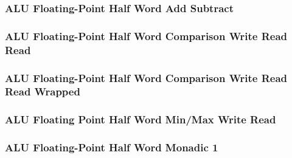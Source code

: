 

\subsubsection[{\small ALU Floating-Point Half Word Add Subtract}]{ALU Floating-Point Half Word Add Subtract} \label{sec:format-ALU-FHADD}



\subsubsection[{\small ALU Floating-Point Half Word Comparison Write Read Read}]{ALU Floating-Point Half Word Comparison Write Read Read} \label{sec:format-ALU-FHCWRR}



\subsubsection[{\small ALU Floating-Point Half Word Comparison Write Read Read Wrapped}]{ALU Floating-Point Half Word Comparison Write Read Read Wrapped} \label{sec:format-ALU-FHCWRR.W}



\subsubsection[{\small ALU Floating Point Half Word Min/Max Write Read}]{ALU Floating Point Half Word Min/Max Write Read} \label{sec:format-ALU-FHMMWR}



\subsubsection[{\small ALU Floating-Point Half Word Monadic 1}]{ALU Floating-Point Half Word Monadic 1} \label{sec:format-ALU-FHMO1}



